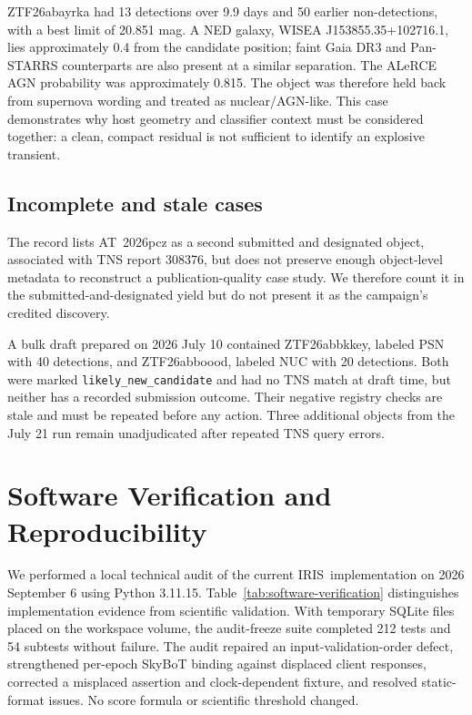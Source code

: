 \documentclass[11pt]{article}
\newcommand{\iris}{IRIS}
\begin{document}
ZTF26abayrka had 13 detections over 9.9 days and 50 earlier non-detections, with a best limit of 20.851 mag. A NED galaxy, WISEA J153855.35+102716.1, lies approximately \SI{0.4}{\arcsec} from the candidate position; faint Gaia DR3 and Pan-STARRS counterparts are also present at a similar separation. The ALeRCE AGN probability was approximately 0.815. The object was therefore held back from supernova wording and treated as nuclear/AGN-like. This case demonstrates why host geometry and classifier context must be considered together: a clean, compact residual is not sufficient to identify an explosive transient.

\subsection{Incomplete and stale cases}

The record lists AT~2026pcz as a second submitted and designated object, associated with TNS report 308376, but does not preserve enough object-level metadata to reconstruct a publication-quality case study. We therefore count it in the submitted-and-designated yield but do not present it as the campaign's credited discovery.

A bulk draft prepared on 2026 July 10 contained ZTF26abbkkey, labeled PSN with 40 detections, and ZTF26abboood, labeled NUC with 20 detections. Both were marked \texttt{likely\_new\_candidate} and had no TNS match at draft time, but neither has a recorded submission outcome. Their negative registry checks are stale and must be repeated before any action. Three additional objects from the July 21 run remain unadjudicated after repeated TNS query errors.

\section{Software Verification and Reproducibility}
\label{sec:software-verification}

We performed a local technical audit of the current \iris\ implementation on 2026 September 6 using Python 3.11.15. Table~\ref{tab:software-verification} distinguishes implementation evidence from scientific validation. With temporary SQLite files placed on the workspace volume, the audit-freeze suite completed 212 tests and 54 subtests without failure. The audit repaired an input-validation-order defect, strengthened per-epoch SkyBoT binding against displaced client responses, corrected a misplaced assertion and clock-dependent fixture, and resolved static-format issues. No score formula or scientific threshold changed.
\end{document}
